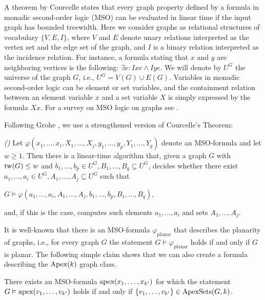 \documentclass{llncs}
\begin{document}
A theorem by Courcelle states that every graph property defined by a formula in monadic
second-order logic (MSO) can be evaluated in linear time if the input graph has bounded treewidth.
Here we consider graphs as relational structures of vocabulary $\{V,E,I\}$,
where $V$ and $E$ denote unary relations interpreted as the vertex set and the edge set of the graph,
and $I$ is a binary relation interpreted as the incidence relation. For instance,
a formula stating that $x$ and $y$ are neighboring vertices is the following: $\exists e: Ixe \land Iye$.
We will denote by $U^G$ the universe of the graph $G$, i.e.,  $U^G = V(G) \cup E(G)$.
Variables in monadic second-order logic can be element or set variables, and the
containment relation between an element variable $x$ and a set variable $X$ is simply expressed by the formula $Xx$.
For a survey on MSO logic on graphs see \cite{cou97}.

Following Grohe \cite{gro04}, we use a strengthened version of Courcelle's Theorem:

\begin{theorem} \emph{(\cite{flu02})}
\label{mso}
Let
$\varphi(x_1, \dots, x_i, X_1, \dots, X_j, y_1, \dots, y_p, Y_1, \dots, Y_q)$
denote an MSO-formula and let $w \geq 1$.
Then there is a linear-time algorithm that, given a graph  $G$ with \emph{$\textup{tw}(G) \leq w$}
and $b_1, \dots, b_p \in U^G, B_1, \dots, B_q \subseteq U^G$, decides whether
there exist $a_1, \dots, a_i \in U^G, A_1, \dots, A_j \subseteq U^G$ such that
\begin{center}
\vspace{-6pt}
$G \vDash \varphi(a_1, \dots, a_i, A_1, \dots, A_j, b_1, \dots, b_p, B_1, \dots, B_q)$,
\vspace{-6pt}
\end{center}
and, if this is the case, computes such elements $a_1, \dots , a_i$ and sets $A_1, \dots, A_j$.
\end{theorem}

It is well-known that there is an MSO-formula $\varphi_{\textrm{planar}}$ that describes the planarity of graphs,
i.e., for every graph $G$ the statement $G \vDash \varphi_{\textrm{planar}}$ holds if and only if $G$ is planar.
The following simple claim shows that we can also create a formula describing the $\textup{Apex}(k)$ graph class.

\begin{theorem}
\label{planar_mso}
There exists an MSO-formula $\textup{apex}(x_1, \dots, x_{k'})$ for which the statement
$G \vDash \textup{apex}(v_1, \dots, v_{k'})$ holds if and only if
$\{v_1, \dots, v_{k'} \} \in \textup{ApexSets}(G,k)$.
\end{theorem}
\end{document}
